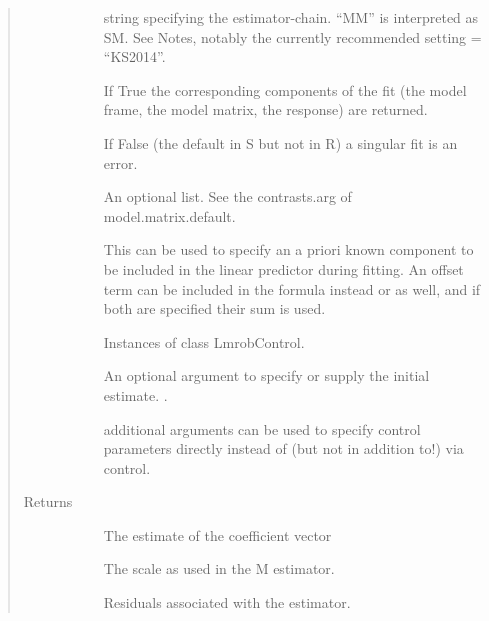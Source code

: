 \documentclass[letterpaper,10pt,english]{sphinxmanual}
\begin{document}
\begin{fulllineitems}
\begin{quote}
\begin{description}
\begin{description}
\item[{}] \leavevmode
string specifying the estimator-chain. “MM” is interpreted as SM.
See Notes, notably the currently recommended setting = “KS2014”.

\item[{}] \leavevmode
If True the corresponding components of  the fit (the model frame, the model
matrix, the response) are returned.

\item[{}] \leavevmode
If False (the default in S but not in R) a singular fit is an error.

\item[{}] \leavevmode
An optional list. See the contrasts.arg of model.matrix.default.

\item[{}] \leavevmode
This can be used to specify an a priori known component to be included in the
linear predictor during fitting. An offset term can be included in the formula
instead or as well, and if both are specified their sum is used.

\item[{}] \leavevmode
Instances of class LmrobControl.

\item[{}] \leavevmode
An optional argument to specify or supply the initial estimate. .

\item[{}] \leavevmode
additional arguments can be used to specify control parameters directly instead
of (but not in addition to!) via control.

\end{description}

\item[{Returns}] \leavevmode\begin{description}
\item[{}] \leavevmode
The estimate of the coefficient vector

\item[{}] \leavevmode
The scale as used in the M estimator.

\item[{}] \leavevmode
Residuals associated with the estimator.


\end{description}
\end{description}
\end{quote}
\end{fulllineitems}
\end{document}
